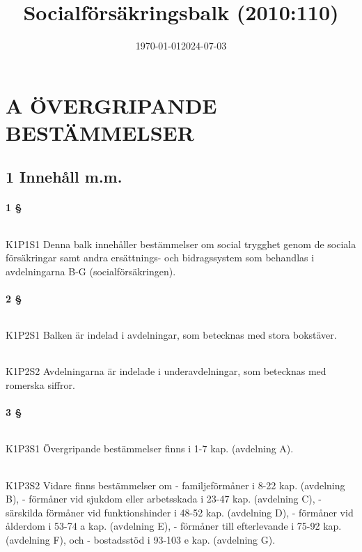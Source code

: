 \documentclass[a4paper,notitlepage,openany,10pt]{book}
\date{\today}
\title{Socialförsäkringsbalk (2010:110)}
\date{2024-07-03}
\begin{document}
\maketitle

\vfill

\newpage
\newpage
\part*{A ÖVERGRIPANDE BESTÄMMELSER}
\chapter*{1 Innehåll m.m.}
\subsection*{1 §}
\paragraph*{}
{\tiny K1P1S1}
Denna balk innehåller bestämmelser om social trygghet genom de sociala försäkringar samt andra ersättnings- och bidragssystem som behandlas i avdelningarna B-G (socialförsäkringen).
\subsection*{2 §}
\paragraph*{}
{\tiny K1P2S1}
Balken är indelad i avdelningar, som betecknas med stora bokstäver.
\paragraph*{}
{\tiny K1P2S2}
Avdelningarna är indelade i underavdelningar, som betecknas med romerska siffror.
\subsection*{3 §}
\paragraph*{}
{\tiny K1P3S1}
Övergripande bestämmelser finns i 1-7 kap. (avdelning A).
\paragraph*{}
{\tiny K1P3S2}
Vidare finns bestämmelser om
\newline - familjeförmåner i 8-22 kap. (avdelning B),
\newline - förmåner vid sjukdom eller arbetsskada i 23-47 kap. (avdelning C),
\newline - särskilda förmåner vid funktionshinder i 48-52 kap. (avdelning D),
\newline - förmåner vid ålderdom i 53-74 a kap. (avdelning E),
\newline - förmåner till efterlevande i 75-92 kap. (avdelning F), och
\newline - bostadsstöd i 93-103 e kap. (avdelning G).
\end{document}
